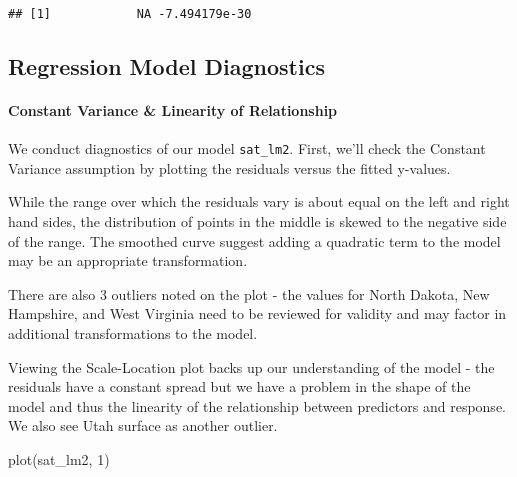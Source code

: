 \documentclass[
]{article}
\newenvironment{Shaded}{\begin{snugshade}}{\end{snugshade}}
\newcommand{\AttributeTok}[1]{\textcolor[rgb]{0.77,0.63,0.00}{#1}}
\newcommand{\DecValTok}[1]{\textcolor[rgb]{0.00,0.00,0.81}{#1}}
\newcommand{\FunctionTok}[1]{\textcolor[rgb]{0.00,0.00,0.00}{#1}}
\newcommand{\NormalTok}[1]{#1}
\newcommand{\SpecialCharTok}[1]{\textcolor[rgb]{0.00,0.00,0.00}{#1}}
\newcommand{\StringTok}[1]{\textcolor[rgb]{0.31,0.60,0.02}{#1}}
\begin{document}
\begin{Shaded}
\end{Shaded}

\begin{verbatim}
## [1]            NA -7.494179e-30
\end{verbatim}

\hypertarget{regression-model-diagnostics}{%
\subsection{Regression Model
Diagnostics}\label{regression-model-diagnostics}}

\hypertarget{constant-variance-linearity-of-relationship}{%
\paragraph{Constant Variance \& Linearity of
Relationship}\label{constant-variance-linearity-of-relationship}}

We conduct diagnostics of our model \texttt{sat\_lm2}. First, we'll
check the Constant Variance assumption by plotting the residuals versus
the fitted y-values.

While the range over which the residuals vary is about equal on the left
and right hand sides, the distribution of points in the middle is skewed
to the negative side of the range. The smoothed curve suggest adding a
quadratic term to the model may be an appropriate transformation.

There are also 3 outliers noted on the plot - the values for North
Dakota, New Hampshire, and West Virginia need to be reviewed for
validity and may factor in additional transformations to the model.

Viewing the Scale-Location plot backs up our understanding of the model
- the residuals have a constant spread but we have a problem in the
shape of the model and thus the linearity of the relationship between
predictors and response. We also see Utah surface as another outlier.

\begin{Shaded}
\begin{Highlighting}[]
\FunctionTok{plot}\NormalTok{(sat\_lm2, }\DecValTok{1}\NormalTok{)}
\end{Highlighting}
\end{Shaded}
\end{document}
